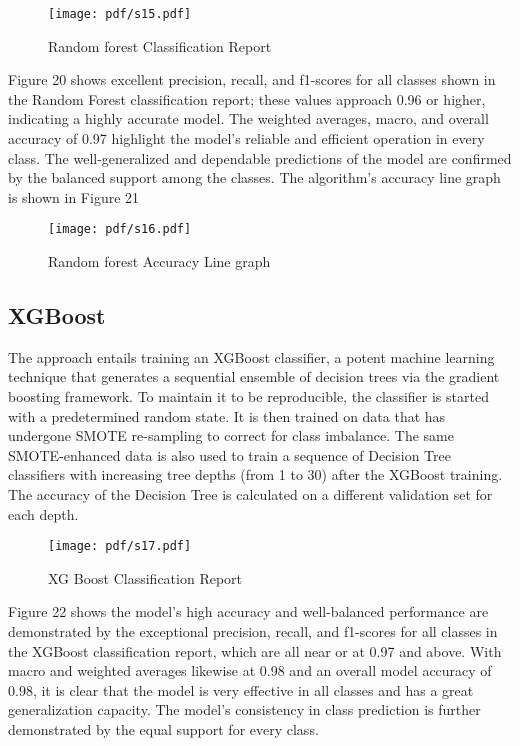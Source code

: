 \begin{figure}[ht!]
  \raggedright
  \texttt{[image: pdf/s15.pdf]}
  \vspace{0pt}
  \caption{\textbf{ }Random forest Classification Report}
\end{figure}
Figure 20 shows excellent precision, recall, and f1-scores for all classes shown in the Random Forest classification report; these values approach 0.96 or higher, indicating a highly accurate model. The weighted averages, macro, and overall accuracy of 0.97 highlight the model's reliable and efficient operation in every class. The well-generalized and dependable predictions of the model are confirmed by the balanced support among the classes. The algorithm's accuracy line graph is shown in Figure 21
\begin{figure}[ht!]
  \raggedright
  \texttt{[image: pdf/s16.pdf]}
  \vspace{0pt}
  \caption{\textbf{ }Random forest Accuracy Line graph}
\end{figure}
\subsection {XGBoost}
The approach entails training an XGBoost classifier, a potent machine learning technique that generates a sequential ensemble of decision trees via the gradient boosting framework. To maintain it to be reproducible, the classifier is started with a predetermined random state. It is then trained on data that has undergone SMOTE re-sampling to correct for class imbalance. The same SMOTE-enhanced data is also used to train a sequence of Decision Tree classifiers with increasing tree depths (from 1 to 30) after the XGBoost training. The accuracy of the Decision Tree is calculated on a different validation set for each depth.
\begin{figure}[ht!]
  \raggedright
  \texttt{[image: pdf/s17.pdf]}
  \vspace{0pt}
  \caption{\textbf{ }XG Boost Classification Report}
\end{figure}
Figure 22  shows the model's high accuracy and well-balanced performance are demonstrated by the exceptional precision, recall, and f1-scores for all classes in the XGBoost classification report, which are all near or at 0.97 and above. With macro and weighted averages likewise at 0.98 and an overall model accuracy of 0.98, it is clear that the model is very effective in all classes and has a great generalization capacity. The model's consistency in class prediction is further demonstrated by the equal support for every class.

